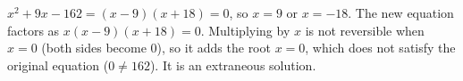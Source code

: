 $x^2+9x-162=(x-9)(x+18)=0$, so $\boxed{x=9\text{ or }x=-18}$. The new equation factors as $x(x-9)(x+18)=0$. Multiplying by $x$ is not reversible when $x=0$ (both sides become $0$), so it adds the root $x=0$, which does not satisfy the original equation ($0\ne162$). It is an extraneous solution.
